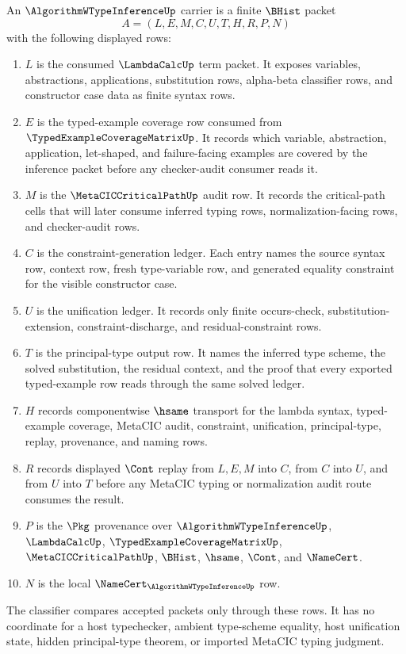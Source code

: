 \begin{definition}
\label{def:algorithm-w-type-inference-carrier}
An $\AlgorithmWTypeInferenceUp$ carrier is a finite $\BHist$ packet
$$
A=(L,E,M,C,U,T,H,R,P,N)
$$
with the following displayed rows:
\begin{enumerate}
\item $L$ is the consumed $\LambdaCalcUp$ term packet. It exposes variables, abstractions, applications, substitution rows, alpha-beta classifier rows, and constructor case data as finite syntax rows.
\item $E$ is the typed-example coverage row consumed from $\TypedExampleCoverageMatrixUp$. It records which variable, abstraction, application, let-shaped, and failure-facing examples are covered by the inference packet before any checker-audit consumer reads it.
\item $M$ is the $\MetaCICCriticalPathUp$ audit row. It records the critical-path cells that will later consume inferred typing rows, normalization-facing rows, and checker-audit rows.
\item $C$ is the constraint-generation ledger. Each entry names the source syntax row, context row, fresh type-variable row, and generated equality constraint for the visible constructor case.
\item $U$ is the unification ledger. It records only finite occurs-check, substitution-extension, constraint-discharge, and residual-constraint rows.
\item $T$ is the principal-type output row. It names the inferred type scheme, the solved substitution, the residual context, and the proof that every exported typed-example row reads through the same solved ledger.
\item $H$ records componentwise $\hsame$ transport for the lambda syntax, typed-example coverage, MetaCIC audit, constraint, unification, principal-type, replay, provenance, and naming rows.
\item $R$ records displayed $\Cont$ replay from $L,E,M$ into $C$, from $C$ into $U$, and from $U$ into $T$ before any MetaCIC typing or normalization audit route consumes the result.
\item $P$ is the $\Pkg$ provenance over $\AlgorithmWTypeInferenceUp$, $\LambdaCalcUp$, $\TypedExampleCoverageMatrixUp$, $\MetaCICCriticalPathUp$, $\BHist$, $\hsame$, $\Cont$, and $\NameCert$.
\item $N$ is the local $\NameCert_{\AlgorithmWTypeInferenceUp}$ row.
\end{enumerate}
The classifier compares accepted packets only through these rows. It has no coordinate for a host typechecker, ambient type-scheme equality, host unification state, hidden principal-type theorem, or imported MetaCIC typing judgment.
\end{definition}

